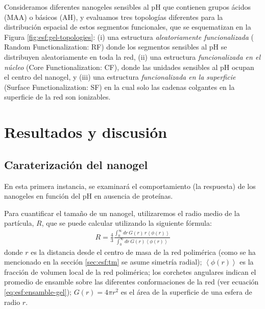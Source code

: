  
 
 Consideramos diferentes nanogeles sensibles al pH que contienen grupos \'acidos (MAA) o b\'asicos (AH), y evaluamos tres topolog\'ias diferentes para la distribuci\'on espacial de estos segmentos funcionales, que se esquematizan en la Figura \ref{fig:esf:gel-topologies}:
 (i) una estructura \emph{aleatoriamente funcionalizada} ( Random Functionalization:  RF) donde los segmentos sensibles al pH se distribuyen aleatoriamente en toda la red,
 (ii) una estructura \emph{funcionalizada en el n\'ucleo} (Core Functionalization: CF), donde las unidades sensibles al pH ocupan el centro del nanogel, y
 (iii) una estructura \emph{funcionalizada en la superficie} (Surface Functionalization: SF) en la cual solo las cadenas colgantes en la superficie de la red son ionizables.
  







\section{Resultados y discusi\'on}






\subsection{Caraterizaci\'on del nanogel}

En esta primera instancia, se examinar\'a el comportamiento (la respuesta) de los nanogeles en funci\'on del pH en ausencia de prote\'inas.

Para cuantificar el tama\~no de un nanogel, utilizaremos el radio medio de la part\'icula, $R$, que se puede calcular utilizando la siguiente f\'ormula:
\begin{align}
	R = \frac{4}{3}\frac{\int_0^\infty{dr\,G(r)\,r \left<\phi(r)\right>}}{\int_0^\infty{dr\,G(r)\left<\phi(r)\right>}}
\end{align}
\noindent donde $r$ es la distancia desde el centro de masa de la red polim\'erica (como se ha mencionado en la secci\'on \ref{sec:esf:tm} se asume simetr\'ia radial);
$\left<\phi(r)\right>$ es la fracci\'on de volumen local de la red polim\'erica;
los corchetes angulares indican el promedio de ensamble sobre las diferentes conformaciones de la red (ver ecuaci\'on \ref{eq:esf:ensamble-gel});
$G(r)=4\pi r^2$ es el \'area de la superficie de una esfera de radio $r$.

